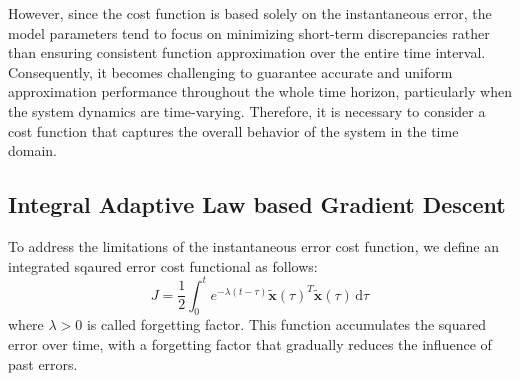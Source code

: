 \documentclass[10pt,twocolumn]{ICCAS}
\newcommand{\ud}{\,\mathrm{d}}
\newcommand{\xtilde}{\tilde{\bm{x}}}
\begin{document}
However, since the cost function is based solely on the instantaneous error, the model parameters tend to focus on minimizing short-term discrepancies rather than ensuring consistent function approximation over the entire time interval. Consequently, it becomes challenging to guarantee accurate and uniform approximation performance throughout the whole time horizon, particularly when the system dynamics are time-varying. Therefore, it is necessary to consider a cost function that captures the overall behavior of the system in the time domain.

\subsection{Integral Adaptive Law based Gradient Descent}

To address the limitations of the instantaneous error cost function, we define an integrated sqaured error cost functional as follows:
\begin{equation}
J = \frac{1}{2} \int_{0}^{t} e^{-\lambda(t-\tau)} {\xtilde(\tau)}^T \xtilde(\tau) \ud\tau 
\end{equation} 
where $\lambda > 0$ is called forgetting factor. This function accumulates the squared error over time, with a forgetting factor that gradually reduces the influence of past errors.
\end{document}

